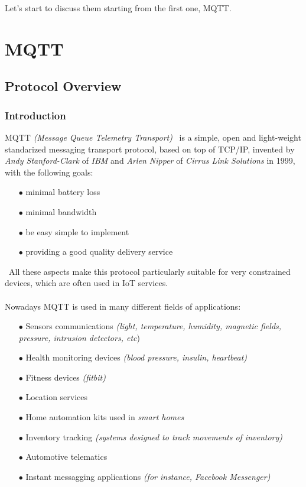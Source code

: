 \documentclass[12pt]{report}
\begin{document}
{\setlength{\parindent}{0cm}
Let's start to discuss them starting from the first one, MQTT.

\part{MQTT}

\chapter{Protocol Overview}

\section{Introduction}
\bigskip
\textsc{MQTT} \emph{(Message Queue Telemetry Transport)}~\cite{mqttrfc} is a simple, open and light-weight standarized messaging transport protocol, based on top of TCP/IP, invented by \emph{Andy Stanford-Clark} of \emph{IBM} and \emph{Arlen Nipper} of \emph{Cirrus Link Solutions}\cite{cirruslink} in 1999, with the following goals:


\begin{itemize}
\setlength{\itemindent}{+4mm}
  \item[$\bullet$] minimal battery loss
  \item[$\bullet$] minimal bandwidth
  \item[$\bullet$] be easy simple to implement
  \item[$\bullet$] providing a good quality delivery service
\end{itemize}\
All these aspects make this protocol particularly suitable for very constrained devices, which are often used in IoT services.\\\\
Nowadays MQTT is used in many different fields of applications:

 \begin{itemize}
 \setlength{\itemindent}{+4mm}
  \item[$\bullet$] Sensors communications \emph{(light, temperature, humidity, magnetic fields, pressure, intrusion detectors, etc})
  \item[$\bullet$] Health monitoring devices \emph{(blood pressure, insulin, heartbeat)}
  \item[$\bullet$] Fitness devices\emph{ (fitbit)}
  \item[$\bullet$] Location services
  \item[$\bullet$] Home automation kits used in \emph{smart homes}
  \item[$\bullet$] Inventory tracking \emph{(systems designed to track movements of inventory)}
  \item[$\bullet$] Automotive telematics
  \item[$\bullet$] Instant messagging applications \emph{(for instance, Facebook Messenger)}
\end{itemize}\

}
\end{document}
